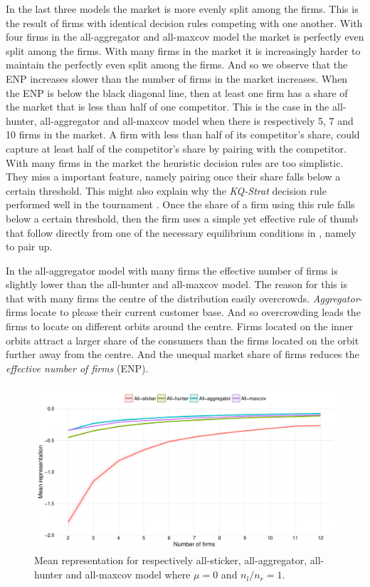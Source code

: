 \documentclass[preprint, 12pt]{elsarticle}
\begin{document}
In the last three models the market is more evenly split among the firms. This is the result of firms with identical decision rules competing with one another. With four firms in the all-aggregator and all-maxcov model the market is perfectly even split among the firms. With many firms in the market it is increasingly harder to maintain the perfectly even split among the firms. And so we observe that the ENP increases slower than the number of firms in the market increases. When the ENP is below the black diagonal line, then at least one firm has a share of the market that is less than half of one competitor. This is the case in the all-hunter, all-aggregator and all-maxcov model when there is respectively 5, 7 and 10 firms in the market. A firm with less than half of its competitor's share, could capture at least half of the competitor's share by pairing with the competitor. With many firms in the market the heuristic decision rules are too simplistic. They miss a important feature, namely pairing once their share falls below a certain threshold. This might also explain why the \emph{KQ-Strat} decision rule performed well in the tournament \citep{Fowler_Laver_2008}. Once the share of a firm using this rule falls below a certain threshold, then the firm uses a simple yet effective rule of thumb that follow directly from one of the necessary equilibrium conditions in \cite{Eaton_Lipsey_1975}, namely to pair up.

In the all-aggregator model with many firms the effective number of firms is slightly lower than the all-hunter and all-maxcov model. The reason for this is that with many firms the centre of the distribution easily overcrowds. \emph{Aggregator}-firms locate to please their current customer base. And so overcrowding leads the firms to locate on different orbits around the centre. Firms located on the inner orbits attract a larger share of the consumers than the firms located on the orbit further away from the centre. And the unequal market share of firms reduces the \emph{effective number of firms} (ENP).

\begin{figure}[ht!]
	\centering
	\includegraphics[width=\textwidth]{Graphics/fig23a.pdf}
	\caption{Mean representation for respectively all-sticker, all-aggregator, all-hunter and all-maxcov model where $\mu=0$ and $n_l/n_r=1$.}
	\label{fig:representation}
\end{figure}
\end{document}
